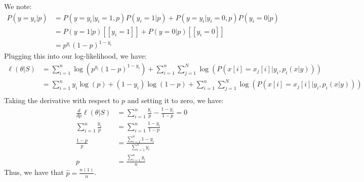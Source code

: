 \documentclass{amsart}
\theoremstyle{definition}
\begin{document}
\begin{enumerate}[(a)]
		We note:
		\begin{align*}
			P(y = y_i|p) &= P(y = y_i| y_i = 1, p)P(y_i = 1| p) + P(y = y_i| y_i = 0, p)P(y_i = 0| p)\\
			&= P(y = 1 |p)[[y_i = 1]] + P(y = 0 | p)[[y_i = 0]]\\
			&= p^{y_i}(1-p)^{1-y_i}
		\end{align*}
		Plugging this into our log-likelihood, we have:
		\begin{align*}
			\ell(\theta|S) &= \sum_{i=1}^{n}\log(p^{y_i}(1-p)^{1-y_i}) + \sum_{i=1}^{n}\sum_{j=1}^{N} \log(P(x[i] = x_j[i]| y_i, p_i(x|y)))\\
			&= \sum_{i=1}^{n}y_i\log(p) + (1-y_i)\log(1-p) + \sum_{i=1}^{n}\sum_{j=1}^{N} \log(P(x[i] = x_j[i]| y_i, p_i(x|y)))\\
		\end{align*}
		Taking the derivative with respect to $p$ and setting it to zero, we have:
		\begin{align*}
			\frac{d}{dp}\ell(\theta|S) &= \sum_{i=1}^{n}\frac{y_i}{p} - \frac{1-y_i}{1-p} = 0\\
			\sum_{i=1}^{n}\frac{y_i}{p} &= \sum_{i=1}^{n}\frac{1-y_i}{1-p}\\
			\frac{1-p}{p} &= \frac{\sum_{i = 1}^{n} 1- y_i}{\sum_{i = 1}^{n} y_i}\\
			p &= \frac{\sum_{i = 1}^{n} y_i}{n}
		\end{align*}
		Thus, we have that $\hat{p} = \frac{n(1)}{n}$.


\end{enumerate}
\end{document}
